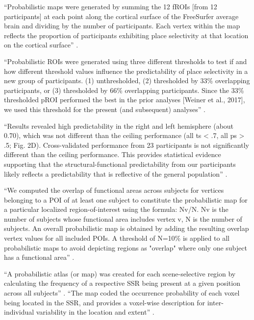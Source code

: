 %
``Probabilistic maps were generated by summing the 12 fROIs [from 12
participants] at each point along the cortical surface of the FreeSurfer average
brain and dividing by the number of participants.
%
Each vertex within the map reflects the proportion of participants exhibiting
place selectivity at that location on the cortical surface''
\citep{weiner2018defining}.

%
``Probabilistic ROIs were generated using three different thresholds to test if
and how different threshold values influence the predictability of place
selectivity in a new group of participants.
%
(1) unthresholded,
%
(2) thresholded by 33\% overlapping participants, or
%
(3) thresholded by 66\% overlapping participants.
%
Since the 33\% thresholded pROI performed the best in the prior analyses [Weiner
et al., 2017], we used this threshold for the present (and subsequent)
analyses'' \citep{weiner2018defining}.

%
``Results revealed high predictability in the right and left hemisphere (about
0.70), which was not different than the ceiling performance (all ts < .7, all ps
> .5; Fig. 2D).
%
Cross-validated performance from 23 participants is not significantly different
than the ceiling performance.
%
This provides statistical evidence supporting that the structural-functional
predictability from our participants likely reflects a predictability that is
reflective of the general population'' \citep{weiner2018defining}.

%
``We computed the overlap of functional areas across subjects for vertices
belonging to a POI of at least one subject to constitute the probabilistic map
for a particular localized region-of-interest using the formula: Nv/N.
%
Nv is the number of subjects whose functional area includes vertex v,
%
N is the number of subjects.
%
An overall probabilistic map is obtained by adding the resulting overlap vertex
values for all included POIs.
%
A threshold of N=10\% is applied to all probabilistic maps to avoid depicting
regions as "overlap" where only one subject has a functional area''
\citep{frost2012measuring}.


%
``A probabilistic atlas (or map) was created for each scene-selective region by
calculating the frequency of a respective SSR being present at a given position
across all subjects'' \citep{zhen2017quantifying}.
%
``The map coded the occurrence probability of each voxel being located in the
SSR, and provides a voxel-wise description for inter-individual variability in
the location and extent'' \citep{zhen2017quantifying}.


